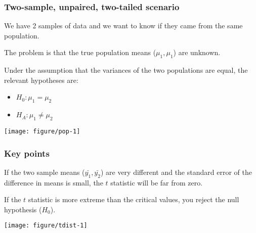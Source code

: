 \documentclass[color=usenames,dvipsnames]{beamer}\usepackage[]{graphicx}\usepackage[]{color}
\makeatletter
\def\maxwidth{ %
  \ifdim\Gin@nat@width>\linewidth
    \linewidth
  \else
    \Gin@nat@width
  \fi
}
\newenvironment{knitrout}{}{} %
\makeatother
\begin{document}
\begin{frame}[fragile]
  \frametitle{Two-sample, unpaired, two-tailed scenario}
  \small
  We have 2 samples of data and we want to know if they came from
  the same population. \\
  \pause
  \vfill

  The problem is that the true population means ($\mu_1, \mu_1$) are
  unknown. \\ %
  \pause
  \vfill

Under the assumption that the variances of the two populations are
equal, the relevant hypotheses are:
\begin{itemize}
  \footnotesize
  \item $H_0: \mu_1 = \mu_2$
  \item $H_A: \mu_1 \neq \mu_2$
\end{itemize}
  \normalsize
  \pause
  \vfill
\begin{knitrout}
\color{fgcolor}
\texttt{[image: figure/pop-1]} 

\end{knitrout}
\end{frame}




\begin{frame}[fragile]
  \frametitle{Key points}


  \small
  If the two sample means ($\bar{y_1}, \bar{y_2}$) are very
  different and the standard error of the difference in means is
  small, the $t$ statistic will be far from zero. \\
  \pause
  \vfill

  If the $t$ statistic is more extreme than the critical
  values, you reject the null hypothesis ($H_0$). \\
  \pause
  \vfill

  \centering
  \texttt{[image: figure/tdist-1]} \\
\end{frame}


\end{document}
